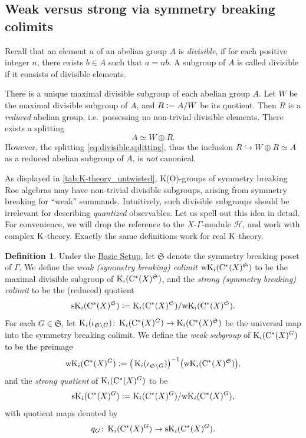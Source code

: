 \documentclass{amsart}
\numberwithin{figure}{section}
\numberwithin{equation}{section}
\numberwithin{table}{section}
\theoremstyle{plain}
\theoremstyle{definition}
\newtheorem{definition}[equation]{Definition}
\theoremstyle{remark}
\theoremstyle{nonumber}
\newcommand{\refbasicsetup}{\hyperref[basic_setup]{Basic Setup}}
\newcommand{\K}{\relax\ifmmode\operatorname{K}\else\textup{K}\fi}
\newcommand{\Cst}{\relax\ifmmode\mathrm{C}^*\else\textup{C*}\fi}
\newcommand{\defeq}{\mathrel{\vcentcolon=}}
\begin{document}
\subsection{Weak versus strong via symmetry breaking colimits}
\label{sec:weak_vs_strong}

\medskip
Recall that an element $a$ of an abelian group $A$ is \emph{divisible}, if for each positive integer $n$, there exists $b\in A$ such that $a=nb$.
A subgroup of \( A \) is called divisible if it consists of divisible
elements.

There is a unique maximal divisible subgroup of each abelian group \(
  A \).  Let \( W \) be the maximal divisible subgroup of \( A \), and \(
R\defeq A/W \) be its quotient. Then \( R \) is a \emph{reduced} abelian
group, i.e.~possessing no non-trivial divisible elements. There exists
a splitting
\begin{equation}\label{eq:divisible.splitting}
A\simeq W\oplus R.
\end{equation}
However, the splitting
\eqref{eq:divisible.splitting}, thus the inclusion $R\hookrightarrow
  W\oplus R\simeq A$ as a reduced abelian subgroup of \( A \), is
\emph{not} canonical.

As displayed in \cref{tab:K-theory_untwisted},
K(O)-groups of symmetry breaking Roe algebras may have non-trivial divisible
subgroups, arising from symmetry breaking for ``weak'' summands.
Intuitively, such divisible subgroups should be irrelevant for describing
\emph{quantized} observables. Let us spell out this idea in detail. For
convenience, we will drop the reference to the
$X$-$\Gamma$-module $\mathcal{H}$, and work with complex $\K$-theory.
Exactly the same definitions work for real $\K$-theory.

\begin{definition}\label{dfn:weak_strong}
Under the \refbasicsetup, let $\mathfrak{S}$ denote the symmetry breaking
poset of $\Gamma$. We define the \emph{weak
(symmetry breaking) colimit} ${\rm wK}_i(\Cst(X)^\mathfrak{S})$ to be the
maximal divisible subgroup of $\K_i(\Cst(X)^\mathfrak{S})$, and the
\emph{strong (symmetry breaking) colimit} to be the (reduced) quotient
\begin{equation}\label{eq:strong_K}
{\rm sK}_i(\Cst(X)^\mathfrak{S})\defeq \K_i(\Cst(X)^\mathfrak{S})/{\rm wK}_i(\Cst(X)^\mathfrak{S}).
\end{equation}
For each $G\in \mathfrak{S}$, let $\K_i(\iota_{\mathfrak{S}\backslash
G})\colon \K_i(\Cst(X)^G)\to \K_i(\Cst(X)^\mathfrak{S})$ be the universal map into the symmetry breaking colimit.
We define the \emph{weak subgroup} of $\K_i(\Cst(X)^G)$ to be the preimage
\[
{\rm wK}_i(\Cst(X)^G)\defeq \big(\K_i(\iota_{\mathfrak{S}\backslash G})\big)^{-1}\big({\rm wK}_i(\Cst(X)^\mathfrak{S})\big),
\]
and the \emph{strong quotient} of $\K_i(\Cst(X)^G)$ to be
\begin{equation}\label{eq:strong.quotient}
{\rm sK}_i(\Cst(X)^G)\defeq \K_i(\Cst(X)^G)/{\rm wK}_i(\Cst(X)^G),
\end{equation}
with quotient maps denoted by
\[
q_G\colon \K_i(\Cst(X)^G) \to {\rm sK}_i(\Cst(X)^G).
\]
\end{definition}
\end{document}
